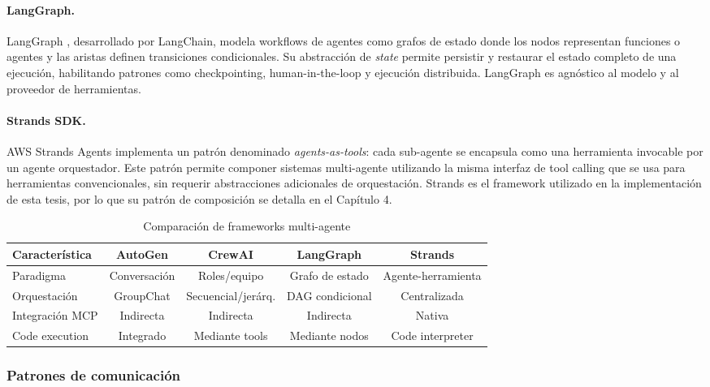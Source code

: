 \paragraph{LangGraph.} LangGraph \citep{langgraph2024}, desarrollado por
LangChain, modela workflows de agentes como grafos de estado donde los nodos
representan funciones o agentes y las aristas definen transiciones condicionales.
Su abstracción de \textit{state} permite persistir y restaurar el estado
completo de una ejecución, habilitando patrones como checkpointing,
human-in-the-loop y ejecución distribuida. LangGraph es agnóstico al modelo y
al proveedor de herramientas.

\paragraph{Strands SDK.} AWS Strands Agents \citep{strands2025sdk} implementa
un patrón denominado \textit{agents-as-tools}: cada sub-agente se encapsula
como una herramienta invocable por un agente orquestador. Este patrón permite
componer sistemas multi-agente utilizando la misma interfaz de tool calling que
se usa para herramientas convencionales, sin requerir abstracciones adicionales
de orquestación. Strands es el framework utilizado en la implementación de esta
tesis, por lo que su patrón de composición se detalla en el Capítulo 4.

\begin{table}[H]
\centering
\small
\begin{tabular}{lcccc}
\toprule
\textbf{Característica} & \textbf{AutoGen} & \textbf{CrewAI} & \textbf{LangGraph} & \textbf{Strands} \\
\midrule
Paradigma & Conversación & Roles/equipo & Grafo de estado & Agente-herramienta \\
Orquestación & GroupChat & Secuencial/jerárq. & DAG condicional & Centralizada \\
Integración MCP & Indirecta & Indirecta & Indirecta & Nativa \\
Code execution & Integrado & Mediante tools & Mediante nodos & Code interpreter \\
\bottomrule
\end{tabular}
\caption{Comparación de frameworks multi-agente}
\label{tab:multiagent-frameworks}
\end{table}

\subsubsection{Patrones de comunicación}

